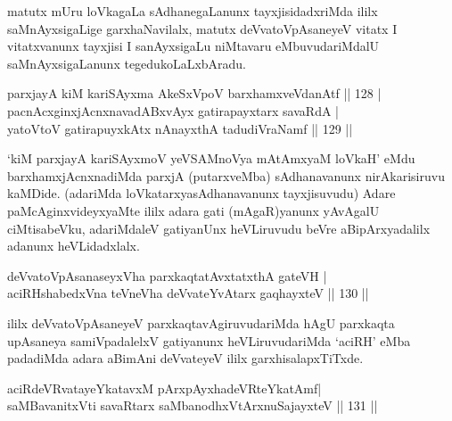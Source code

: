 \begin{artha}
matutx mUru loVkagaLa sAdhanegaLanunx tayxjisidadxriMda ililx
saMnAyxsigaLige garxhaNavilalx, matutx deVvatoVpAsaneyeV vitatx I
vitatxvanunx tayxjisi I sanAyxsigaLu niMtavaru eMbuvudariMdalU
saMnAyxsigaLanunx tegedukoLaLxbAradu.
\end{artha}


\begin{shl}
parxjayA kiM kariSAyxma AkeSxVpoV barxhamxveVdanAtf \hfill|| 128 | \\
pacnAcxginxjAcnxnavadABxvAyx gatirapayxtarx savaRdA | \\
yatoV\s toV gatirapuyxkAtx nAnayxthA tadudiVraNamf \hfill|| 129 || 
\end{shl}

\begin{artha}
`kiM parxjayA kariSAyxmoV yeVSAMnoV\s ya mAtAmxyaM loVkaH' eMdu barxhamxjAcnxnadiMda parxjA (putarxveMba) sAdhanavanunx  nirAkarisiruvu kaMDide. (adariMda loVkatarxyasAdhanavanunx  tayxjisuvudu) Adare paMcAginxvideyxyaMte ililx adara gati  (mAgaR)yanunx yAvAgalU ciMtisabeVku, adariMdaleV gatiyanUnx  heVLiruvudu beVre aBipArxyadalilx adanunx heVLidadxlalx.
\end{artha}


\begin{shl}
deVvatoVpAsanaseyxVha parxkaqtatAvxtatxthA gateVH | \\
aciRHshabedxVna teVneVha deVvateYvAtarx gaqhayxteV \hfill|| 130 || 
\end{shl}

\begin{artha}
ililx deVvatoVpAsaneyeV parxkaqtavAgiruvudariMda hAgU parxkaqta
upAsaneya samiVpadalelxV gatiyanunx heVLiruvudariMda `aciRH' eMba
padadiMda adara aBimAni deVvateyeV ililx garxhisalapxTiTxde. 
\end{artha}

\begin{shl}
aciRdeVRvatayeYkatavxM pArxpAyxhadeVRteYkatAmf\footnotemark[1] | \\
saMBavanitxVti savaRtarx saMbanodhxV\s tArxnuSajayxteV \hfill|| 131 || 
\end{shl}

